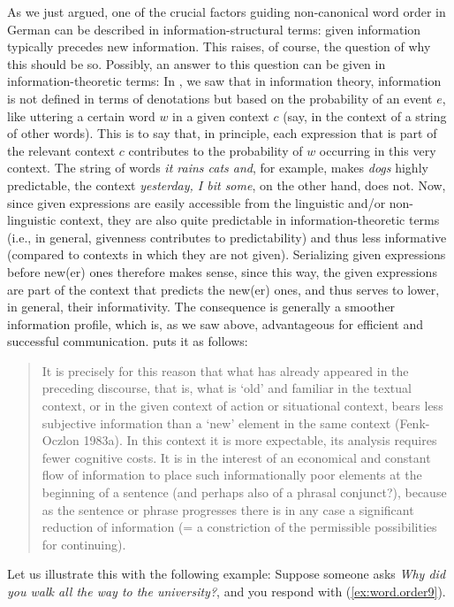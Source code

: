\documentclass[output=paper,colorlinks,citecolor=brown]{langscibook}
\begin{document}
As we just argued, one of the crucial factors guiding non-canonical word order in German can be described in information-structural terms: given information typically precedes new information. This raises, of course, the question of why this should be so. Possibly, an answer to this question can be given in information-theoretic terms: In , we saw that in information theory, information is not defined in terms of denotations but based on the probability of an event $e$, like uttering a certain word $w$ in a given context $c$ (say, in the context of a string of other words). This is to say that, in principle, each expression that is part of the relevant context $c$ contributes to the probability of $w$ occurring in this very context. The string of words \textit{it rains cats and}, for example, makes \textit{dogs} highly predictable, the context \textit{yesterday, I bit some}, on the other hand, does not. Now, since given expressions are easily accessible from the linguistic and/or non-linguistic context, they are also quite predictable in information-theoretic terms (i.e., in general, givenness contributes to predictability) and thus less informative (compared to contexts in which they are not given). Serializing given expressions before new(er) ones therefore makes sense, since this way, the given expressions are part of the context that predicts the new(er) ones, and thus serves to lower, in general, their informativity. The consequence is generally a smoother information profile, which is, as we saw above, advantageous for efficient and successful communication. \citet[519]{fenk-oczlon1989} puts it as follows:
\begin{quote}
It is precisely for this reason that what has already appeared in the preceding discourse, that is, what is `old' and familiar in the textual context, or in the given context of action or situational context, bears less subjective information than a `new' element in the same context (Fenk-Oczlon 1983a). In this context it is more expectable, its analysis requires fewer cognitive costs. It is in the interest of an economical and constant flow of information to place such informationally poor elements at the beginning of a sentence (and perhaps also of a phrasal conjunct?), because as the sentence or phrase progresses there is in any case a significant reduction of information (= a constriction of the permissible possibilities for continuing).
\end{quote}

Let us illustrate this with the following example: Suppose someone asks \textit{Why did you walk all the way to the university?}, and you respond with (\ref{ex:word.order9}).  
\end{document}
